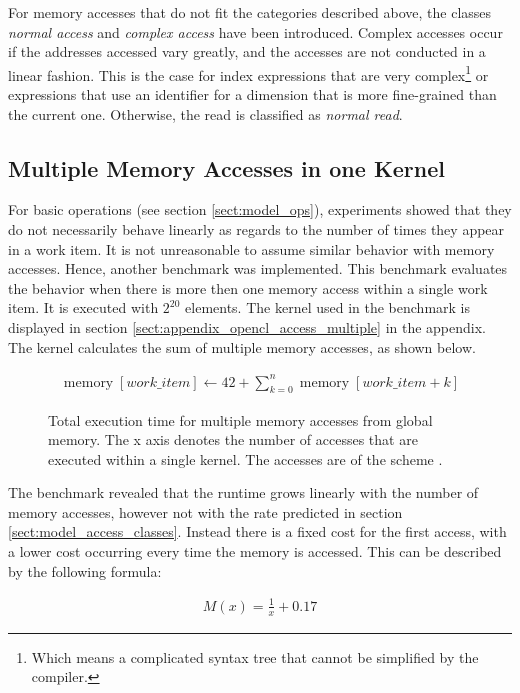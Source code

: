 For memory accesses that do not fit the categories described above, the classes \textit{normal access} and \textit{complex access} have been introduced. Complex accesses occur if the addresses accessed vary greatly, and the accesses are not conducted in a linear fashion. This is the case for index expressions that are very complex\footnote{Which means a complicated syntax tree that cannot be simplified by the compiler.} or expressions that use an identifier for a dimension that is more fine-grained than the current one. Otherwise, the read is classified as \textit{normal read}.

\subsection{Multiple Memory Accesses in one Kernel}
\label{sect:model_access_multiple}

For basic operations (see section \ref{sect:model_ops}), experiments showed that they do not necessarily behave linearly as regards to the number of times they appear in a work item. It is not unreasonable to assume similar behavior with memory accesses. Hence, another benchmark was implemented. This benchmark evaluates the behavior when there is more then one memory access within a single work item. It is executed with $2^{20}$ elements. The kernel used in the benchmark is displayed in section \ref{sect:appendix_opencl_access_multiple} in the appendix. The kernel calculates the sum of multiple memory accesses, as shown below.

\begin{gather*}
	\operatorname{memory}[work\_item] \leftarrow 42 + \sum_{k=0}^{n}\operatorname{memory}[work\_item + k]
\end{gather*}

\begin{figure}
	\begin{center}
		\caption{Total execution time for multiple memory accesses from global memory. The x axis denotes the number of accesses that are executed within a single kernel. The accesses are of the scheme .}
		\label{fig:model_access_multiple}
	\end{center}
\end{figure}

The benchmark revealed that the runtime grows linearly with the number of memory accesses, however not with the rate predicted in section \ref{sect:model_access_classes}. Instead there is a fixed cost for the first access, with a lower cost occurring every time the memory is accessed. This can be described by the following formula:

\begin{gather}
	M(x) = \frac{1}{x} + 0.17
\end{gather}